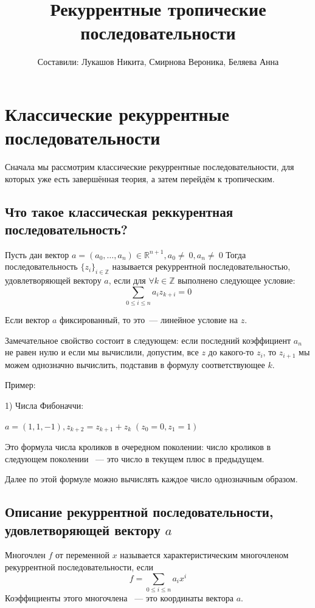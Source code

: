 \documentclass[russian]{lecture-notes}
\title{Рекуррентные тропические последовательности}
\author{Составили: Лукашов Никита, Смирнова Вероника, Беляева Анна}
\date{}
\begin{document}

\maketitle
{}
\section{Классические рекуррентные последовательности}

 Сначала мы рассмотрим классические рекуррентные последовательности, для которых уже есть завершённая теория, а затем перейдём к тропическим.
\subsection{Что такое классическая реккурентная последовательность?}

\begin{Definition}
	Пусть дан вектор $ a=(a_0,\ldots, a_n) \in \mathbb{R}^{n+1}, a_0 \ne~0, a_n \ne~0$
	Тогда последовательность $\{z_{i}\}_{i\in \mathbb{Z}}$ называется рекуррентной последовательностью, удовлетворяющей вектору $a$, если для $ \forall k \in \mathbb{Z} $ выполнено следующее условие:
	\[
	\sum_{0\le i \le n}a_iz_{k+i}=0
	\]
\end{Definition}

Если вектор $a$ фиксированный, то это~--- линейное условие на $z$.


 Замечательное свойство состоит в следующем: если последний коэффициент $a_n$ не равен нулю и если мы вычислили, допустим, все $z$ до какого-то $z_i$, то $z_{i+1}$ мы можем однозначно вычислить, подставив в формулу соответствующее $k$.

Пример:

1) Числа Фибоначчи:

$a=(1, 1, -1), z_{k+2}=z_{k+1}+z_k \; (z_0=0, z_1=1)$

Это формула числа кроликов в очередном поколении: число кроликов в следующем поколении ~--- это число в текущем плюс в предыдущем.

Далее по этой формуле можно вычислять каждое число однозначным образом.
\subsection{Описание рекуррентной последовательности, удовлетворяющей вектору $a$}

\begin{Definition}
	Многочлен $f$ от переменной $x$ называется характеристическим многочленом рекуррентной последовательности, если
	\[
	f=\sum_{0\le i \le n}a_ix^i
	\]
	Коэффициенты этого многочлена ~--- это координаты вектора $a$.
	\vspace{\baselineskip}
\end{Definition}
\end{document}
